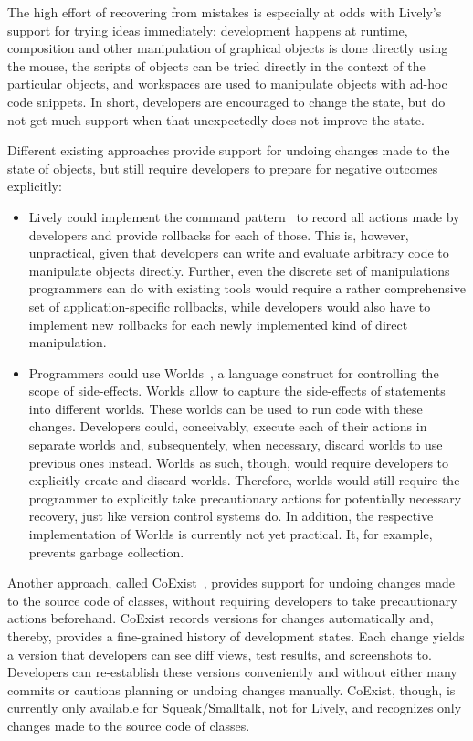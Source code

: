 The high effort of recovering from mistakes is especially at odds with Lively's support for trying ideas immediately: development happens at runtime, composition and other manipulation of graphical objects is done directly using the mouse, the scripts of objects can be tried directly in the context of the particular objects, and workspaces are used to manipulate objects with ad-hoc code snippets.
In short, developers are encouraged to change the state, but do not get much support when that unexpectedly does not improve the state.

Different existing approaches provide support for undoing changes made to the state of objects, but still require developers to prepare for negative outcomes explicitly:
\begin{itemize}
    \item Lively could implement the command pattern~\cite{GammaHelmJohnsonVlissides95} to record all actions made by developers and provide rollbacks for each of those. This is, however, unpractical, given that developers can write and evaluate arbitrary code to manipulate objects directly. Further, even the discrete set of manipulations programmers can do with existing tools would require a rather comprehensive set of application-specific rollbacks, while developers would also have to implement new rollbacks for each newly implemented kind of direct manipulation.
    \item Programmers could use Worlds~\cite{Warth2011Wor}, a language construct for controlling the scope of side-effects. Worlds allow to capture the side-effects of statements into different worlds. These worlds can be used to run code with these changes. Developers could, conceivably, execute each of their actions in separate worlds and, subsequentely, when necessary, discard worlds to use previous ones instead. Worlds as such, though, would require developers to explicitly create and discard worlds. Therefore, worlds would still require the programmer to explicitly take precautionary actions for potentially necessary recovery, just like version control systems do. In addition, the respective implementation of Worlds is currently not yet practical. It, for example, prevents garbage collection.
\end{itemize}

Another approach, called CoExist~\cite{Steinert2012COE}, provides support for undoing changes made to the source code of classes, without requiring developers to take precautionary actions beforehand.
CoExist records versions for changes automatically and, thereby, provides a fine-grained history of development states.
Each change yields a version that developers can see diff views, test results, and screenshots to.
Developers can re-establish these versions conveniently and without either many commits or cautions planning or undoing changes manually.
CoExist, though, is currently only available for Squeak/Smalltalk, not for Lively, and recognizes only changes made to the source code of classes.

